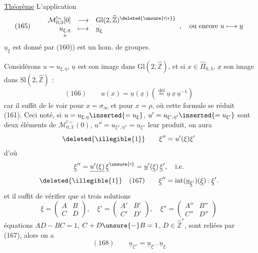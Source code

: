 \uline{Théorème} L'application
\[
(165)\qquad
\begin{array}{rcl}
\mathcal M_{0,3}^{!\sim}[0]&\longrightarrow&
\mathrm{Gl}(2,\widehat{\mathbb Z})^{\deleted{\unsure{\prime|*}}}\\
\underset{u}{u_{\xi,\eta}}&\longmapsto&\underline u_\xi
\end{array},
\quad\text{ou encore }u\longmapsto\underline u
\]
$\underline u_\xi$ est donné par (160)) est un hom. de groupes.



Considérons $u=u_{\xi,\eta}$,
$\underline u$ est son image dans $\mathrm{Gl}(2,\widehat{\mathbb Z})$,
et si $x\in\widehat\Pi_{0,3}$, $\underline x$
son image dans $\mathrm{Sl}(2,\widehat{\mathbb Z})$ :
\[
(166)\qquad
\underline{u(x)}=\underline u(\underline x)
\left(\stackrel{\text{déf}}{=}
\underline u\,\underline x\,\underline u^{-1}\right)
\]
car il suffit de le voir pour $x=\sigma_\infty$ et pour $x=\rho$,
où cette formule se réduit  (161). Ceci noté,
si $u=u_{\xi,\eta}\inserted{=u_\xi}$,
$u'=u_{\xi',\eta'}\inserted{=u_{\xi'}}$
sont deux éléments de $\mathcal M_{0,3}^{!\sim}(0)$,
$u''=u_{\xi'',\eta''}=u_{\xi''}$ leur produit, on aura
\[
\deleted{\illegible{1}}\qquad\xi''=u'(\xi)\xi'
\]
d'où
\[
\underline\xi''=\underline{u'(\xi)}\,\underline\xi^{\unsure{\prime}}
=\underline u'(\underline\xi)\,\underline\xi',\quad\text{i.e.}
\]
\[
\deleted{\illegible{1}}\quad(167)\qquad
\underline\xi''=\operatorname{int}
(\underline u_{\underline\xi'})(\underline\xi)\mathbin{.}\underline\xi'.
\]
et il suffit de vérifier que si trois solutions
\[
\xi=\begin{pmatrix}A&B\\C&D\end{pmatrix},
\quad\xi'=\begin{pmatrix}A'&B'\\C'&D'\end{pmatrix},
\quad\xi''=\begin{pmatrix}A''&B''\\C''&D''\end{pmatrix}
\]
 équations
$AD-BC=1$, $C+D\unsure{-}B=1$, $D\in\widehat{\mathbb Z}^{*}$,
sont reliées par (167), alors on a
\[
(168)\qquad
\underline u_{\xi''}=\underline u_{\xi'}\mathbin{.}\underline u_\xi
\]

